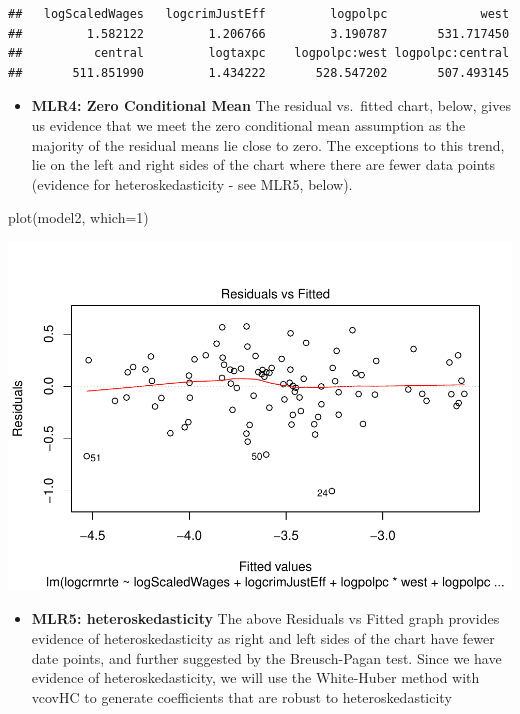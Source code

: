 \documentclass[]{article}
\newenvironment{Shaded}{}{}
\newcommand{\DataTypeTok}[1]{#1}
\newcommand{\DecValTok}[1]{#1}
\newcommand{\KeywordTok}[1]{\textcolor[rgb]{0.00,0.00,1.00}{#1}}
\newcommand{\NormalTok}[1]{#1}
\providecommand{\tightlist}{%
  \setlength{\itemsep}{0pt}\setlength{\parskip}{0pt}}
\begin{document}
\begin{verbatim}
##   logScaledWages   logcrimJustEff         logpolpc             west 
##         1.582122         1.206766         3.190787       531.717450 
##          central         logtaxpc    logpolpc:west logpolpc:central 
##       511.851990         1.434222       528.547202       507.493145
\end{verbatim}

\begin{itemize}
\tightlist
\item
  \textbf{MLR4: Zero Conditional Mean} The residual vs.~fitted chart,
  below, gives us evidence that we meet the zero conditional mean
  assumption as the majority of the residual means lie close to zero.
  The exceptions to this trend, lie on the left and right sides of the
  chart where there are fewer data points (evidence for
  heteroskedasticity - see MLR5, below).
\end{itemize}

\begin{Shaded}
\begin{Highlighting}[]
\KeywordTok{plot}\NormalTok{(model2, }\DataTypeTok{which=}\DecValTok{1}\NormalTok{)}
\end{Highlighting}
\end{Shaded}

\includegraphics{Bagnard_Gaustad_Hartman_Leung_Lab_3_files/figure-latex/unnamed-chunk-72-1.pdf}

\begin{itemize}
\tightlist
\item
  \textbf{MLR5: heteroskedasticity} The above Residuals vs Fitted graph
  provides evidence of heteroskedasticity as right and left sides of the
  chart have fewer date points, and further suggested by the
  Breusch-Pagan test. Since we have evidence of heteroskedasticity, we
  will use the White-Huber method with vcovHC to generate coefficients
  that are robust to heteroskedasticity
\end{itemize}
\end{document}
